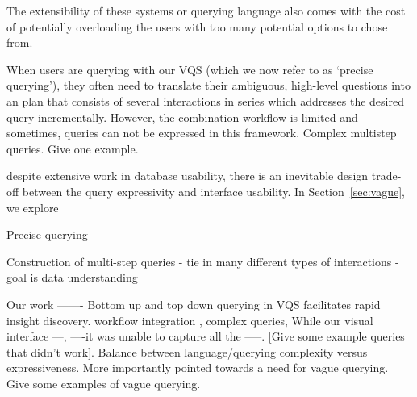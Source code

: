 The extensibility of these systems or querying language also comes with the cost of potentially overloading the users with too many potential options to chose from. 

\par When users are querying with our VQS (which we now refer to as `precise querying'), they often need to translate their ambiguous, high-level questions into an plan that consists of several interactions in series which addresses the desired query incrementally. However, the combination workflow is limited and sometimes, queries can not be expressed in this framework. Complex multistep queries. Give one example. 
\par despite extensive work in database usability, there is an inevitable design trade-off between the query expressivity and interface usability\cite{Morton2014,Jagadish2007}. In Section~\ref{sec:vague}, we explore 




Precise querying 

Construction of multi-step queries
- tie in many different types of interactions
- goal is data understanding 

\par Our \zv work ------- Bottom up and top down querying in VQS facilitates rapid insight discovery. 
workflow integration , complex queries,
While our visual interface ---, ----it was unable to capture all the -----. [Give some example queries that didn't work]. Balance between language/querying complexity versus expressiveness. More importantly pointed towards a need for vague querying. Give some examples of vague querying.

